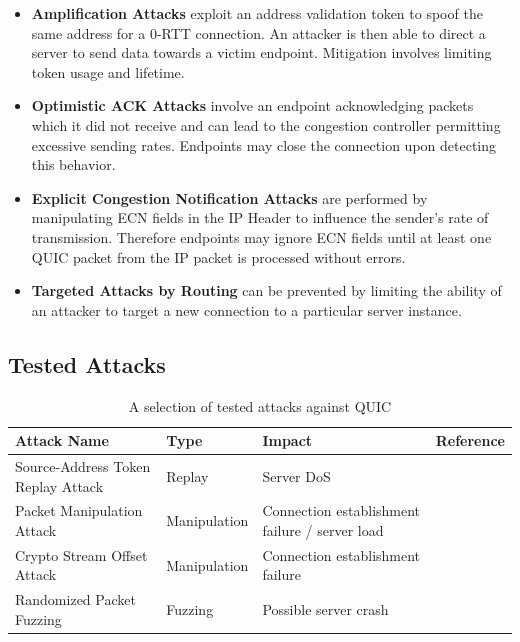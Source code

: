 \begin{itemize}
    \item \textbf{Amplification Attacks} exploit an address validation token to spoof the same address for a 0-RTT connection. An attacker is then able to direct a server to send data towards a victim endpoint. Mitigation involves limiting token usage and lifetime.
    \item \textbf{Optimistic ACK Attacks} involve an endpoint acknowledging packets which it did not receive and can lead to the congestion controller permitting excessive sending rates. Endpoints may close the connection upon detecting this behavior.
    \item \textbf{Explicit Congestion Notification Attacks} are performed by manipulating ECN fields in the IP Header to influence the sender's rate of transmission. Therefore endpoints may ignore ECN fields until at least one QUIC packet from the IP packet is processed without errors.
    \item \textbf{Targeted Attacks by Routing} can be prevented by limiting the ability of an attacker to target a new connection to a particular server instance.
\end{itemize}

\subsection{Tested Attacks}

\begin{table}[H]
\begin{center}
    \begin{tabular}{| p{40mm} | l | p{60mm} | l |}
    \hline
    \textbf{Attack Name} & \textbf{Type} & \textbf{Impact} & \textbf{Reference} \\ \hline
    Source-Address Token Replay Attack & Replay & Server DoS & \cite{quic_security_2} \\ \hline
    Packet Manipulation Attack & Manipulation & Connection establishment failure / server load & \cite{quic_security_1} \cite{quic_security_2} \\ \hline
    Crypto Stream Offset Attack & Manipulation & Connection establishment failure & \cite{quic_security_1} \\ \hline
    Randomized Packet Fuzzing & Fuzzing & Possible server crash & \cite{quic_security_3} \\ \hline
    \end{tabular}
\end{center}
\caption{A selection of tested attacks against QUIC}
\label{table_tested_attacks}
\end{table}

